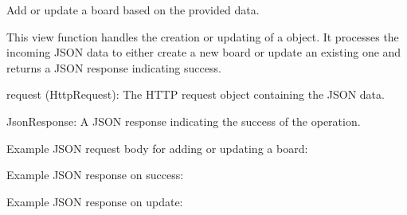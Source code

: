 \documentclass[letterpaper,10pt,english]{sphinxmanual}
\begin{document}
\begin{fulllineitems}
\label{\detokenize{app:app.views.update_board}}
\pysigstartsignatures
{}
\pysigstopsignatures
\sphinxAtStartPar
Add or update a board based on the provided data.

\sphinxAtStartPar
This view function handles the creation or updating of a  object. 
It processes the incoming JSON data to either create a new board or update an existing one 
and returns a JSON response indicating success.
\begin{description}
\sphinxAtStartPar
request (HttpRequest): The HTTP request object containing the JSON data.

\sphinxAtStartPar
JsonResponse: A JSON response indicating the success of the operation.

\sphinxAtStartPar
Example JSON request body for adding or updating a board:

\begin{sphinxVerbatim}[commandchars=\\\{\}]
\end{sphinxVerbatim}

\sphinxAtStartPar
Example JSON response on success:

\begin{sphinxVerbatim}[commandchars=\\\{\}]
\end{sphinxVerbatim}

\sphinxAtStartPar
Example JSON response on update:

\begin{sphinxVerbatim}[commandchars=\\\{\}]
\end{sphinxVerbatim}


\end{description}
\end{fulllineitems}
\end{document}
